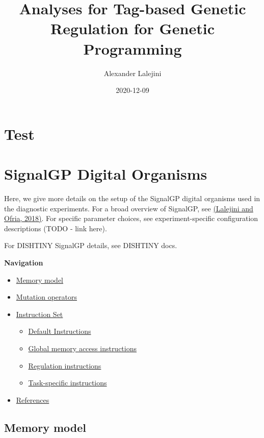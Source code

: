 \documentclass[
]{book}
\title{Analyses for Tag-based Genetic Regulation for Genetic Programming}
\author{Alexander Lalejini}
\date{2020-12-09}
\providecommand{\tightlist}{%
  \setlength{\itemsep}{0pt}\setlength{\parskip}{0pt}}
\begin{document}
\maketitle

{
\setcounter{tocdepth}{1}
\tableofcontents
}
\hypertarget{test}{%
\chapter{Test}\label{test}}

\hypertarget{signalgp-digital-organisms}{%
\chapter{SignalGP Digital Organisms}\label{signalgp-digital-organisms}}

Here, we give more details on the setup of the SignalGP digital organisms used in the diagnostic
experiments. For a broad overview of SignalGP, see \href{https://doi.org/10.1145/3205455.3205523}{(Lalejini and Ofria, 2018)}. For specific parameter choices, see experiment-specific configuration descriptions (TODO - link here).

For DISHTINY SignalGP details, see DISHTINY docs.

\textbf{Navigation}

\begin{itemize}
\tightlist
\item
  \protect\hyperlink{memory-model}{Memory model}
\item
  \protect\hyperlink{mutation-operators}{Mutation operators}
\item
  \protect\hyperlink{instruction-set}{Instruction Set}

  \begin{itemize}
  \tightlist
  \item
    \protect\hyperlink{default-instructions}{Default Instructions}
  \item
    \protect\hyperlink{global-memory-access-instructions}{Global memory access instructions}
  \item
    \protect\hyperlink{regulation-instructions}{Regulation instructions}
  \item
    \protect\hyperlink{task-specific-instructions}{Task-specific instructions}
  \end{itemize}
\item
  \protect\hyperlink{references}{References}
\end{itemize}

\hypertarget{memory-model}{%
\section{Memory model}\label{memory-model}}
\end{document}
